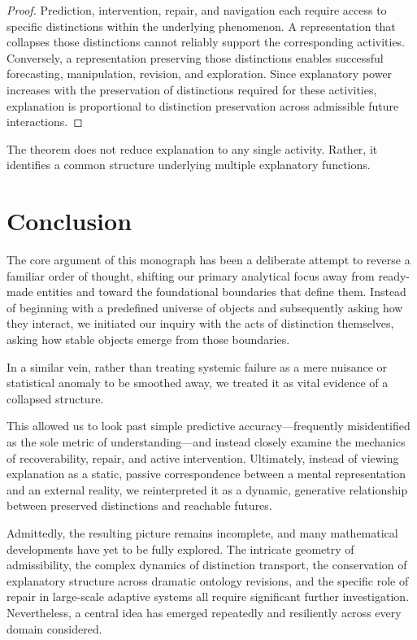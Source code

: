 \documentclass[11pt,oneside,openany]{book}
\begin{document}
\begin{proof}

Prediction, intervention, repair, and navigation each require access to specific distinctions within the underlying phenomenon. A representation that collapses those distinctions cannot reliably support the corresponding activities. Conversely, a representation preserving those distinctions enables successful forecasting, manipulation, revision, and exploration. Since explanatory power increases with the preservation of distinctions required for these activities, explanation is proportional to distinction preservation across admissible future interactions.

\end{proof}

The theorem does not reduce explanation to any single activity. Rather, it identifies a common structure underlying multiple explanatory functions.


\section{Conclusion}

The core argument of this monograph has been a deliberate attempt to reverse a familiar order of thought, shifting our primary analytical focus away from ready-made entities and toward the foundational boundaries that define them. Instead of beginning with a predefined universe of objects and subsequently asking how they interact, we initiated our inquiry with the acts of distinction themselves, asking how stable objects emerge from those boundaries.

In a similar vein, rather than treating systemic failure as a mere nuisance or statistical anomaly to be smoothed away, we treated it as vital evidence of a collapsed structure. 

This allowed us to look past simple predictive accuracy—frequently misidentified as the sole metric of understanding—and instead closely examine the mechanics of recoverability, repair, and active intervention. Ultimately, instead of viewing explanation as a static, passive correspondence between a mental representation and an external reality, we reinterpreted it as a dynamic, generative relationship between preserved distinctions and reachable futures.

Admittedly, the resulting picture remains incomplete, and many mathematical developments have yet to be fully explored. The intricate geometry of admissibility, the complex dynamics of distinction transport, the conservation of explanatory structure across dramatic ontology revisions, and the specific role of repair in large-scale adaptive systems all require significant further investigation. Nevertheless, a central idea has emerged repeatedly and resiliently across every domain considered.
\end{document}

